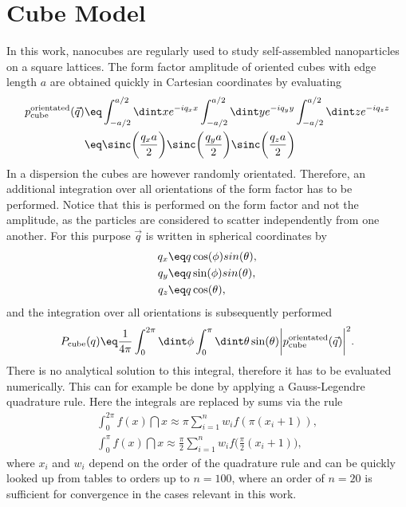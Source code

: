 \documentclass[\main/dresen_thesis.tex]{subfiles}
\begin{document}
\section{Cube Model}\label{ch:appendix:formfactors:cube}
In this work, nanocubes are regularly used to study self-assembled nanoparticles on a square lattices.
The form factor amplitude of oriented cubes with edge length $a$ are obtained quickly in Cartesian coordinates by evaluating
\begin{align}
  p^\mathrm{orientated}_\mathrm{cube} (\vec{q})
  \eq & \int_{-a/2}^{a/2} \dint x e^{-i q_x x} \int_{-a/2}^{a/2} \dint y e^{-i q_y y} \int_{-a/2}^{a/2} \dint z e^{-i q_z z} \\
  \eq & \sinc \biggl(\frac{q_x a}{2} \biggr)\sinc\biggl(\frac{q_y a}{2} \biggr)\sinc\biggl(\frac{q_z a}{2} \biggr)
\end{align}
In a dispersion the cubes are however randomly orientated. Therefore, an additional integration over all orientations of the form factor has to be performed. Notice that this is performed on the form factor and not the amplitude, as the particles are considered to scatter independently from one another. For this purpose $\vec{q}$ is written in spherical coordinates by
\begin{align}
  q_x \eq& q \cos(\phi) sin(\theta),\\
  q_y \eq& q \sin(\phi) sin(\theta),\\
  q_z \eq& q \cos(\theta),\\
\end{align}
and the integration over all orientations is subsequently performed
\begin{align}
  P_\mathrm{cube} (q) \eq \frac{1}{4 \pi} \int_0^{2\pi} \dint \phi \int_0^{\pi} \dint \theta \sin(\theta) \biggl| p^\mathrm{orientated}_\mathrm{cube} (\vec{q}) \biggr|^2.
\end{align}
There is no analytical solution to this integral, therefore it has to be evaluated numerically. This can for example be done by applying a Gauss-Legendre quadrature rule. Here the integrals are replaced by sums via the rule
\begin{align}
  \int_0^{2\pi} f(x) \dint x \approx \pi \sum_{i=1}^n w_i f(\pi (x_i + 1)),\\
  \int_0^{\pi} f(x) \dint x \approx \frac{\pi}{2} \sum_{i=1}^n w_i f\biggl(\frac{\pi}{2} (x_i + 1) \biggr),
\end{align}
where $x_i$ and $w_i$ depend on the order of the quadrature rule and can be quickly looked up from tables to orders up to $n = 100$, where an order of $n = 20$ is sufficient for convergence in the cases relevant in this work.
\end{document}
